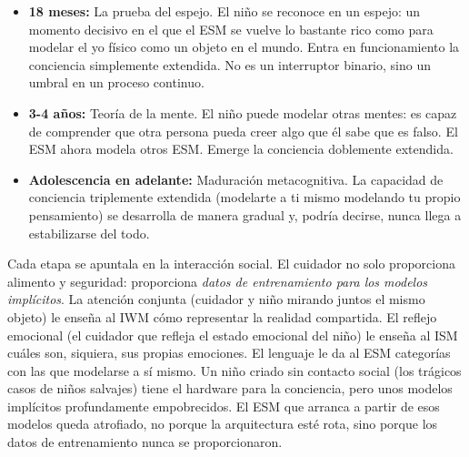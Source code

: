 \documentclass[11pt, twoside, openright]{book}
\begin{document}
\begin{itemize}
  \item \textbf{18 meses:} La prueba del espejo. El niño se reconoce en un espejo: un momento decisivo en el que el ESM se vuelve lo bastante rico como para modelar el yo físico como un objeto en el mundo. Entra en funcionamiento la conciencia simplemente extendida. No es un interruptor binario, sino un umbral en un proceso continuo.
\end{itemize}

\begin{itemize}
  \item \textbf{3-4 años:} Teoría de la mente. El niño puede modelar otras mentes: es capaz de comprender que otra persona pueda creer algo que él sabe que es falso. El ESM ahora modela otros ESM. Emerge la conciencia doblemente extendida.
\end{itemize}

\begin{itemize}
  \item \textbf{Adolescencia en adelante:} Maduración metacognitiva. La capacidad de conciencia triplemente extendida (modelarte a ti mismo modelando tu propio pensamiento) se desarrolla de manera gradual y, podría decirse, nunca llega a estabilizarse del todo.
\end{itemize}

Cada etapa se apuntala en la interacción social. El cuidador no solo proporciona alimento y seguridad: proporciona \textit{datos de entrenamiento para los modelos implícitos}. La atención conjunta (cuidador y niño mirando juntos el mismo objeto) le enseña al IWM cómo representar la realidad compartida. El reflejo emocional (el cuidador que refleja el estado emocional del niño) le enseña al ISM cuáles son, siquiera, sus propias emociones. El lenguaje le da al ESM categorías con las que modelarse a sí mismo. Un niño criado sin contacto social (los trágicos casos de niños salvajes) tiene el hardware para la conciencia, pero unos modelos implícitos profundamente empobrecidos. El ESM que arranca a partir de esos modelos queda atrofiado, no porque la arquitectura esté rota, sino porque los datos de entrenamiento nunca se proporcionaron.
\end{document}
